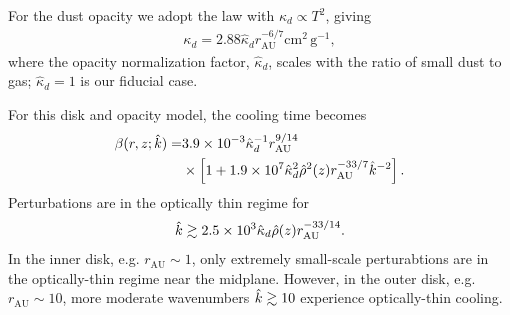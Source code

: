 For the dust opacity we adopt the \citet{bell94} law with $\kappa_d
\propto T^2$, giving 
\begin{align}
 \kappa_d %
    =
   2.88\hat{\kappa}_d r_\mathrm{AU}^{-6/7}\mathrm{cm}^2\,\mathrm{g}^{-1},   
\end{align}
where the opacity normalization factor, $\hat{\kappa}_d$, scales with
the ratio of small dust to gas;  $\hat{\kappa}_d = 1$ is our fiducial
case. 


For this disk and opacity model, the cooling time becomes
\begin{align}\label{beta_mmsn_simp}
  \beta(r,z;\hat{k})\notag = &3.9\times10^{-3}\hat{\kappa}_d^{-1}
  r_\mathrm{AU}^{9/14}
  \notag\\ &\times \left[1 +
    1.9\times10^7\hat{\kappa}_d^{2}\hat{\rho}^2(z)r_\mathrm{AU}^{-33/7}\hat{k}^{-2}\right]. 
\end{align}
Perturbations are in the optically thin regime for
\begin{align}
  \hat{k}\gtrsim 2.5\times10^3\hat{\kappa}_d\hat{\rho}(z)r_\mathrm{AU}^{-33/14}.  
\end{align}
In the inner disk, e.g. $r_\mathrm{AU}\sim 1$, only
extremely small-scale perturabtions are in the optically-thin
regime near the midplane. However, in the outer disk, e.g. $r_\mathrm{AU}\sim 10$, 
 more moderate wavenumbers $\hat{k}\gtrsim 10$ experience optically-thin cooling.

